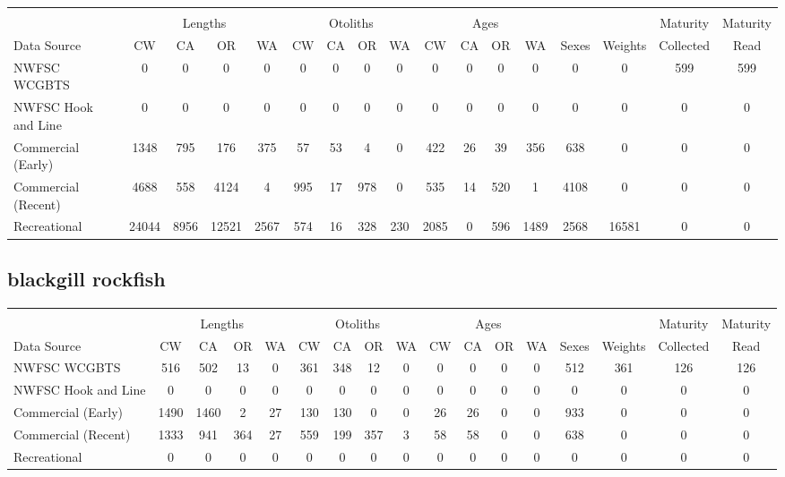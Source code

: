 \documentclass[12pt,]{article}
\begin{document}
\begin{table}[ht]
\centering
\begingroup\fontsize{10pt}{10pt}\selectfont
\begin{tabular}{|l|cccc|cccc|cccc|c|c|c|c|}
  \hline
 &  &  &  &  &  &  &  &  &  &  &  &  &  &  &  &  \\ 
   & \multicolumn{4}{c}{Lengths} &  \multicolumn{4}{c}{Otoliths} & \multicolumn{4}{c}{Ages} &  & & Maturity & Maturity\\
 Data Source & CW & CA & OR & WA & CW & CA & OR & WA & CW & CA & OR & WA & Sexes & Weights & Collected & Read\\
 \hline
NWFSC WCGBTS & 0 & 0 & 0 & 0 & 0 & 0 & 0 & 0 & 0 & 0 & 0 & 0 & 0 & 0 & 599 & 599 \\ 
  NWFSC Hook and Line & 0 & 0 & 0 & 0 & 0 & 0 & 0 & 0 & 0 & 0 & 0 & 0 & 0 & 0 & 0 & 0 \\ 
  Commercial (Early) & 1348 & 795 & 176 & 375 & 57 & 53 & 4 & 0 & 422 & 26 & 39 & 356 & 638 & 0 & 0 & 0 \\ 
  Commercial (Recent) & 4688 & 558 & 4124 & 4 & 995 & 17 & 978 & 0 & 535 & 14 & 520 & 1 & 4108 & 0 & 0 & 0 \\ 
  Recreational & 24044 & 8956 & 12521 & 2567 & 574 & 16 & 328 & 230 & 2085 & 0 & 596 & 1489 & 2568 & 16581 & 0 & 0 \\ 
   \hline
\end{tabular}
\endgroup
\end{table}

\FloatBarrier  

\newpage  

\subsection{blackgill rockfish}\label{blackgill-rockfish}

\begin{table}[ht]
\centering
\begingroup\fontsize{10pt}{10pt}\selectfont
\begin{tabular}{|l|cccc|cccc|cccc|c|c|c|c|}
  \hline
 &  &  &  &  &  &  &  &  &  &  &  &  &  &  &  &  \\ 
   & \multicolumn{4}{c}{Lengths} &  \multicolumn{4}{c}{Otoliths} & \multicolumn{4}{c}{Ages} &  & & Maturity & Maturity\\
 Data Source & CW & CA & OR & WA & CW & CA & OR & WA & CW & CA & OR & WA & Sexes & Weights & Collected & Read\\
 \hline
NWFSC WCGBTS & 516 & 502 & 13 & 0 & 361 & 348 & 12 & 0 & 0 & 0 & 0 & 0 & 512 & 361 & 126 & 126 \\ 
  NWFSC Hook and Line & 0 & 0 & 0 & 0 & 0 & 0 & 0 & 0 & 0 & 0 & 0 & 0 & 0 & 0 & 0 & 0 \\ 
  Commercial (Early) & 1490 & 1460 & 2 & 27 & 130 & 130 & 0 & 0 & 26 & 26 & 0 & 0 & 933 & 0 & 0 & 0 \\ 
  Commercial (Recent) & 1333 & 941 & 364 & 27 & 559 & 199 & 357 & 3 & 58 & 58 & 0 & 0 & 638 & 0 & 0 & 0 \\ 
  Recreational & 0 & 0 & 0 & 0 & 0 & 0 & 0 & 0 & 0 & 0 & 0 & 0 & 0 & 0 & 0 & 0 \\ 
   \hline
\end{tabular}
\endgroup
\end{table}
\end{document}

